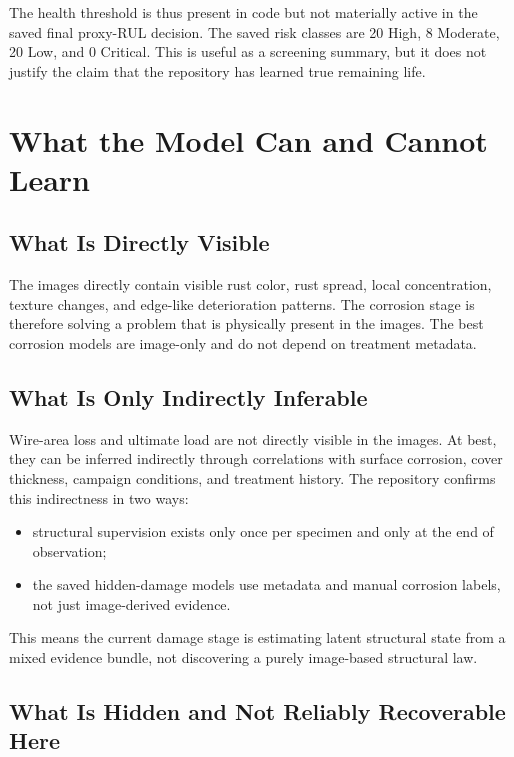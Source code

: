 \documentclass[11pt,a4paper]{article}
\begin{document}
The health threshold is thus present in code but not materially active in the saved final proxy-RUL decision. The saved risk classes are 20 High, 8 Moderate, 20 Low, and 0 Critical. This is useful as a screening summary, but it does not justify the claim that the repository has learned true remaining life.

\section{What the Model Can and Cannot Learn}

\subsection{What Is Directly Visible}

The images directly contain visible rust color, rust spread, local concentration, texture changes, and edge-like deterioration patterns. The corrosion stage is therefore solving a problem that is physically present in the images. The best corrosion models are image-only and do not depend on treatment metadata.

\subsection{What Is Only Indirectly Inferable}

Wire-area loss and ultimate load are not directly visible in the images. At best, they can be inferred indirectly through correlations with surface corrosion, cover thickness, campaign conditions, and treatment history. The repository confirms this indirectness in two ways:
\begin{itemize}
  \item structural supervision exists only once per specimen and only at the end of observation;
  \item the saved hidden-damage models use metadata and manual corrosion labels, not just image-derived evidence.
\end{itemize}

This means the current damage stage is estimating latent structural state from a mixed evidence bundle, not discovering a purely image-based structural law.

\subsection{What Is Hidden and Not Reliably Recoverable Here}
\end{document}
